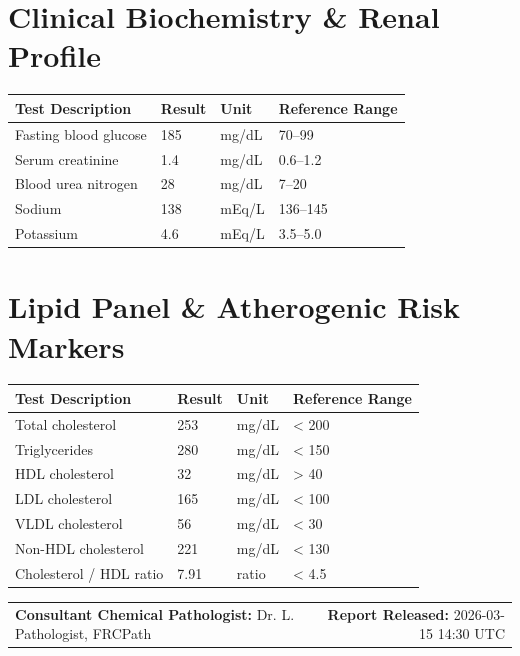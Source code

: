 \documentclass[10pt,a4paper]{article}
\begin{document}
\vspace{8pt}

\section*{Clinical Biochemistry \& Renal Profile}

\begin{tabular}{@{} p{6.4cm} p{2.5cm} p{2.5cm} p{3.1cm} @{}}
  \toprule
  \textbf{Test Description} & \textbf{Result} & \textbf{Unit} & \textbf{Reference Range} \\
  \midrule
  Fasting blood glucose & 185 & mg/dL & 70--99 \\
  Serum creatinine & 1.4 & mg/dL & 0.6--1.2 \\
  Blood urea nitrogen & 28 & mg/dL & 7--20 \\
  Sodium & 138 & mEq/L & 136--145 \\
  Potassium & 4.6 & mEq/L & 3.5--5.0 \\
  \bottomrule
\end{tabular}

\vspace{8pt}

\section*{Lipid Panel \& Atherogenic Risk Markers}

\begin{tabular}{@{} p{6.4cm} p{2.5cm} p{2.5cm} p{3.1cm} @{}}
  \toprule
  \textbf{Test Description} & \textbf{Result} & \textbf{Unit} & \textbf{Reference Range} \\
  \midrule
  Total cholesterol & 253 & mg/dL & < 200 \\
  Triglycerides & 280 & mg/dL & < 150 \\
  HDL cholesterol & 32 & mg/dL & > 40 \\
  LDL cholesterol & 165 & mg/dL & < 100 \\
  VLDL cholesterol & 56 & mg/dL & < 30 \\
  Non-HDL cholesterol & 221 & mg/dL & < 130 \\
  Cholesterol / HDL ratio & 7.91 & ratio & < 4.5 \\
  \bottomrule
\end{tabular}

\vspace{14pt}

\noindent
\begin{tabular*}{\textwidth}{@{} l @{\extracolsep{\fill}} r @{}}
  \textbf{Consultant Chemical Pathologist:} Dr. L. Pathologist, FRCPath & \textbf{Report Released:} 2026-03-15 14:30 UTC \\
\end{tabular*}
\end{document}
